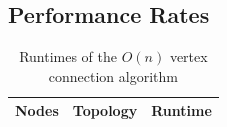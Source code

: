 \documentclass{article}
\begin{document}
  \subsection{Performance Rates}
  \begin{center}
	  \begin{table}[H]
		  \begin{tabular}{ |c|c|c| }
			\hline
			Nodes & Topology & Runtime \\
			\hline
		  \end{tabular}
		  \caption{Runtimes of the $O(n)$ vertex connection algorithm}
	  \end{table}
  \end{center}

\printbibliography
\end{document}
